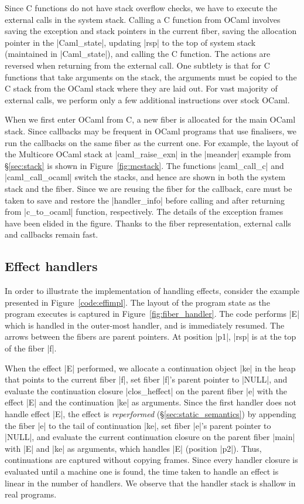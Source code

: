 \documentclass[sigplan,10pt,review,anonymous]{acmart}\settopmatter{printfolios=true,printccs=false,printacmref=false}
\begin{document}
Since C functions do not have stack overflow checks, we have to execute the
external calls in the system stack. Calling a C function from OCaml involves
saving the exception and stack pointers in the current fiber, saving the
allocation pointer in the |Caml_state|, updating |rsp| to the top of system
stack (maintained in |Caml_state|), and calling the C function. The actions are
reversed when returning from the external call. One subtlety is that for C
functions that take arguments on the stack, the arguments must be copied to the
C stack from the OCaml stack where they are laid out. For vast majority of
external calls, we perform only a few additional instructions over stock OCaml.

When we first enter OCaml from C, a new fiber is allocated for the main OCaml
stack. Since callbacks may be frequent in OCaml programs that use finalisers,
we run the callbacks on the same fiber as the current one. For example, the
layout of the Multicore OCaml stack at |caml_raise_exn| in the |meander|
example from \S\ref{sec:stack} is shown in Figure~\ref{fig:mcstack}. The
functions |caml_call_c| and |caml_call_ocaml| switch the stacks, and hence are
shown in both the system stack and the fiber. Since we are reusing the fiber
for the callback, care must be taken to save and restore the |handler_info|
before calling and after returning from |c_to_ocaml| function, respectively.
The details of the exception frames have been elided in the figure. Thanks to
the fiber representation, external calls and callbacks remain fast.

\subsection{Effect handlers}
\label{sec:effimpl}

In order to illustrate the implementation of handling effects, consider the
example presented in Figure~\ref{code:effimpl}. The layout of the program state
as the program executes is captured in Figure~\ref{fig:fiber_handler}. The code
performs |E| which is handled in the outer-most handler, and is immediately
resumed. The arrows between the fibers are parent pointers. At position |p1|,
|rsp| is at the top of the fiber |f|.

When the effect |E| performed, we allocate a continuation object |ke| in the
heap that points to the current fiber |f|, set fiber |f|'s parent pointer to
|NULL|, and evaluate the continuation closure |clos_heffect| on the parent
fiber |e| with the effect |E| and the continuation |ke| as arguments. Since the
first handler does not handle effect |E|, the effect is \emph{reperformed}
(\S\ref{sec:static_semantics}) by appending the fiber |e| to the tail of
continuation |ke|, set fiber |e|'s parent pointer to |NULL|, and evaluate the
current continuation closure on the parent fiber |main| with |E| and |ke| as
arguments, which handles |E| (position |p2|). Thus, continuations are captured
without copying frames. Since every handler closure is evaluated until a
machine one is found, the time taken to handle an effect is linear in the
number of handlers. We observe that the handler stack is shallow in real
programs.
\end{document}
